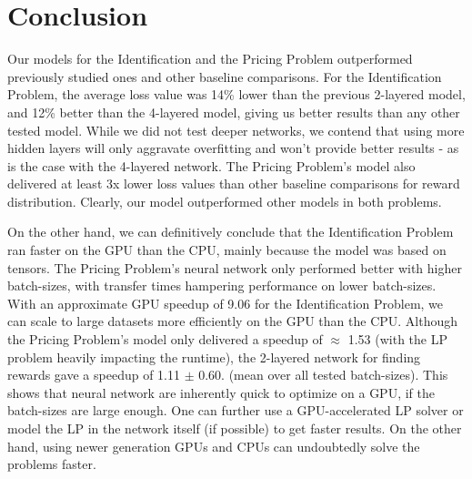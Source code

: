 \documentclass[12pt]{article}
\begin{document}
    \section{Conclusion} \label{sec:Conclusion}
    Our models for the Identification and the Pricing Problem outperformed previously studied ones \cite{Xue2016Avi2} and other baseline comparisons. For the Identification Problem, the average loss value was 14\% lower than the previous 2-layered model, and 12\% better than the 4-layered model, giving us better results than any other tested model. While we did not test deeper networks, we contend that using more hidden layers will only aggravate overfitting and won't provide better results - as is the case with the 4-layered network. The Pricing Problem's model also delivered at least 3x lower loss values than other baseline comparisons for reward distribution. Clearly, our model outperformed other models in both problems.
    
    On the other hand, we can definitively conclude that the Identification Problem ran faster on the GPU than the CPU, mainly because the model was based on tensors. The Pricing Problem's neural network only performed better with higher batch-sizes, with transfer times hampering performance on lower batch-sizes. With an approximate GPU speedup of 9.06 for the Identification Problem, we can scale to large datasets more efficiently on the GPU than the CPU. Although the Pricing Problem's model only delivered a speedup of $\approx$ 1.53 (with the LP problem heavily impacting the runtime), the 2-layered network for finding rewards gave a speedup of 1.11 $\pm$ 0.60. (mean over all tested batch-sizes). This shows that neural network are inherently quick to optimize on a GPU, if the batch-sizes are large enough. One can further use a GPU-accelerated LP solver or model the LP in the network itself (if possible) to get faster results. On the other hand, using newer generation GPUs and CPUs can undoubtedly solve the problems faster.
    
\end{document}
